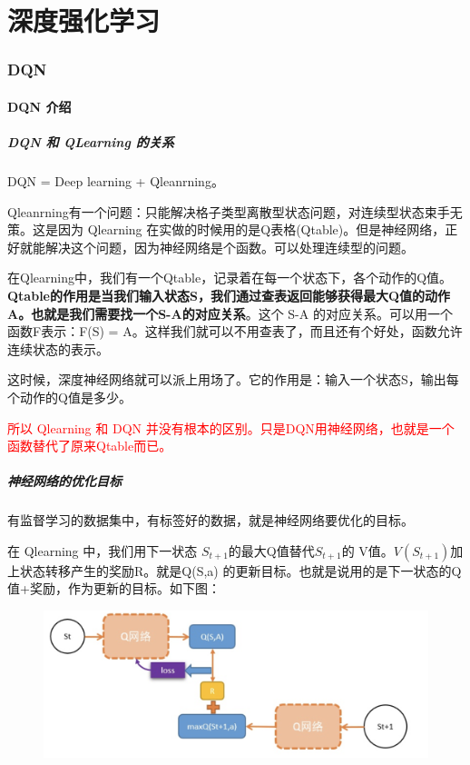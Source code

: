 \documentclass[12pt]{article}
\begin{document}
\part{深度强化学习}
\section{DQN}
\subsection{DQN 介绍}
\subsubsection{DQN 和 QLearning 的关系}
DQN = Deep learning + Qleanrning。

Qleanrning有一个问题：只能解决格子类型离散型状态问题，对连续型状态束手无策。这是因为 Qlearning 在实做的时候用的是Q表格(Qtable)。但是神经网络，正好就能解决这个问题，因为神经网络是个函数。可以处理连续型的问题。


在Qlearning中，我们有一个Qtable，记录着在每一个状态下，各个动作的Q值。\textbf{Qtable的作用是当我们输入状态S，我们通过查表返回能够获得最大Q值的动作A。也就是我们需要找一个S-A的对应关系}。这个 S-A 的对应关系。可以用一个函数F表示：F(S) = A。这样我们就可以不用查表了，而且还有个好处，函数允许连续状态的表示。

这时候，深度神经网络就可以派上用场了。它的作用是：输入一个状态S，输出每个动作的Q值是多少。

\textcolor{red}{所以 Qlearning 和 DQN 并没有根本的区别。只是DQN用神经网络，也就是一个函数替代了原来Qtable而已。}

\subsubsection{神经网络的优化目标}
有监督学习的数据集中，有标签好的数据，就是神经网络要优化的目标。

在 Qlearning 中，我们用下一状态 $S_{t+1}$的最大Q值替代$S_{t+1}$的 V值。$V(S_{t+1})$加上状态转移产生的奖励R。就是Q(S,a) 的更新目标。也就是说用的是下一状态的Q值+奖励，作为更新的目标。如下图：
\begin{figure}[H]
    \centering
    \includegraphics[width=1\textwidth]{fig/ReinforcementLearning/RL_DQN_Example.png}
\end{figure}
\end{document}
